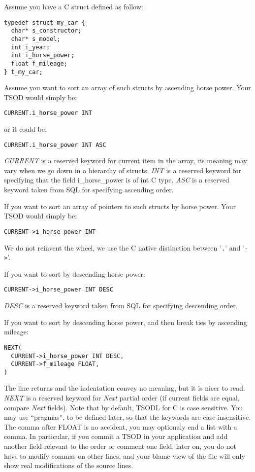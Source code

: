 \documentclass[a4paper,11pt]{report}
\begin{document}
Assume you have a C struct defined as follow:
\begin{verbatim}
typedef struct my_car {
  char* s_constructor;
  char* s_model;
  int i_year;
  int i_horse_power;
  float f_mileage;
} t_my_car;
\end{verbatim}

Assume you want to sort an array of such structs by ascending horse power.
Your TSOD would simply be:
\begin{verbatim}
CURRENT.i_horse_power INT
\end{verbatim}
or it could be:
\begin{verbatim}
CURRENT.i_horse_power INT ASC
\end{verbatim}
\emph{CURRENT} is a reserved keyword for current item in the array,
its meaning may vary when we go down in a hierarchy of structs.
\emph{INT} is a reserved keyword for specifying that the field i\_horse\_power is of int C type.
\emph{ASC} is a reserved keyword taken from SQL for specifying ascending order.

If you want to sort an array of pointers to such structs by horse power.
Your TSOD would simply be:
\begin{verbatim}
CURRENT->i_horse_power INT
\end{verbatim}
We do not reinvent the wheel, we use the C native distinction between '\verb?.?' and '\verb?->?'.

If you want to sort by descending horse power:
\begin{verbatim}
CURRENT->i_horse_power INT DESC
\end{verbatim}
\emph{DESC} is a reserved keyword taken from SQL for specifying descending order.

If you want to sort by descending horse power, and then break ties by ascending mileage:
\begin{verbatim}
NEXT(
  CURRENT->i_horse_power INT DESC,
  CURRENT->f_mileage FLOAT,
)
\end{verbatim}
The line returns and the indentation convey no meaning,
but it is nicer to read.
\emph{NEXT} is a reserved keyword for \emph{Next} partial order (if current fields are equal, compare \emph{Next} fields).
Note that by default, TSODL for C is case sensitive.
You may use ``pragmas'', to be defined later, so that the keywords are case insensitive.
The comma after FLOAT is no accident, you may optionaly end a list with a comma.
In particular, if you commit a TSOD in your application and add another field
relevant to the order or comment one field, later on, you do not have to modify commas on other lines,
and your blame view of the file will only show real modifications of the source lines.
\end{document}
